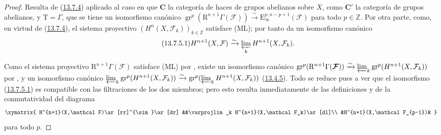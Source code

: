 \documentclass[10pt,oneside,openany]{book}
\theoremstyle{egaenv}\newtheorem*{env}{---}
\theoremstyle{egastatement}
\theoremstyle{egadescription}
\newcommand{\oldpage}[2][]{\marginnote{\normalfont\scriptsize\textbf{#1}\,|\,#2}\ignorespaces}
\begin{document}
\begin{proof}
Resulta de (\hyperref[0.13.7.4-fr]{13.7.4}) aplicado al caso en que $\boldsymbol{C}$ la categoría de haces de
grupos abelianos sobre $X$, como $\boldsymbol{C}'$ la categoría de grupos abelianos,
y $\mathrm T=\Gamma$, que se tiene un isomorfismo
\oldpage[0\textsubscript{III}]{77}
canónico
$\operatorname{gr}^p(\mathrm R^{n+1}\Gamma(\boldsymbol{\mathcal F}))
\xrightarrow{\sim}\mathrm E_\infty^{p,n-p+1}(\boldsymbol{\mathcal F})$ para todo $p\in\mathbb Z$. Por otra parte, como, en virtud de (\hyperref[0.13.7.4-fr]{13.7.4}), el sistema proyectivo $(H^n(X,\mathcal F_k))_{k\in\mathbb Z}$ satisface {\rm(ML)}; por tanto
 da un isomorfismo canónico
\begin{equation}
\label{0.13.7.5.1b-fr}
\tag{13.7.5.1}
H^{n+1}(X,\mathcal F)\xrightarrow{\sim}
\varprojlim_k H^{n+1}(X,\mathcal F_k).
\end{equation}

Como el sistema proyectivo
$\mathrm R^{n+1}\Gamma(\boldsymbol{\mathcal F})$ satisface {\rm(ML)} por
, existe un isomorfismo canónico
$\operatorname{gr}^p(\mathrm R^{n+1}\Gamma(\boldsymbol{\mathcal F}))
\xrightarrow{\sim}
\varprojlim_k\operatorname{gr}^p(H^{n+1}(X,\mathcal F_k))$
por , y un isomorfismo canónico
$\varprojlim_k\operatorname{gr}^p(H^{n+1}(X,\mathcal F_k))
\xrightarrow{\sim}
\operatorname{gr}^p(\varprojlim_k H^{n+1}(X,\mathcal F_k))$
(\hyperref[0.13.4.5-fr]{13.4.5}). Todo se reduce pues a ver que
el isomorfismo (\hyperref[0.13.7.5.1-fr]{13.7.5.1}) es compatible con
las filtraciones de los dos miembros; pero esto resulta inmediatamente de las
definiciones y de la conmutatividad del diagrama
\[
\xymatrix{
H^{n+1}(X,\mathcal F)\ar[rr]^{\sim}\ar[dr]
&&\varprojlim_k H^{n+1}(X,\mathcal F_k)\ar[dl]\\
&H^{n+1}(X,\mathcal F_{p-1})&
}
\]
para todo $p$.
\end{proof}
\end{document}
